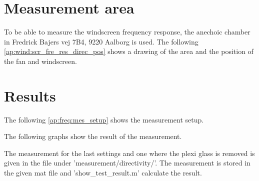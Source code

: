 \section*{Measurement area}
To be able to measure the windscreen frequency response, the anechoic chamber in Fredrick Bajers vej 7B4, 9220 Aalborg is used. The following \autoref{ap:wind:scr_fre_res_direc_pos} shows a drawing of the area and the position of the fan and windscreen.


\section*{Results}

The following \autoref{ap:freq:mes_setup} shows the measurement setup.


The following graphs show the result of the measurement. 





 
 
The measurement for the last settings and one where the plexi glass is removed is given in the file under 'measurement/directivity/'. The measurement is stored in the given mat file and 'show_test_result.m' calculate the result.



 
 